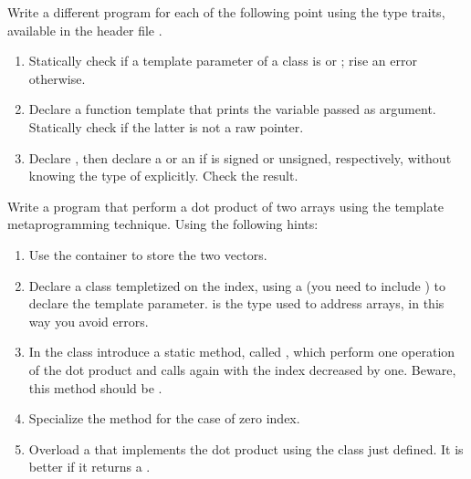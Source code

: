 Write a different program for each of the following point using the type traits,
available in the header file .
\begin{enumerate}

    \item Statically check if a template parameter of a class is  or
    ; rise an error otherwise.

    \item Declare a function template that prints the variable passed as
    argument. Statically check if the latter is not a raw pointer.

    \item Declare , then declare a  or an
     if  is signed or unsigned, respectively, without knowing
    the type of  explicitly. Check the result.

\end{enumerate}

Write a program that perform a dot product of two arrays using the template
metaprogramming technique. Using the following hints:

\begin{enumerate}

    \item Use the container  to store the two vectors.

    \item Declare a class templetized on the index, using a 
    (you need to include ) to declare the template parameter.
     is the type used to address arrays, in this way you avoid
    errors.

    \item In the class introduce a static method, called , which
    perform one operation of the dot product and calls again  with
    the index decreased by one. Beware, this method should be .

    \item Specialize the method  for the case of zero index.

    \item Overload a  that implements the dot product using the
    class just defined.  It is better if it returns a .

\end{enumerate}
